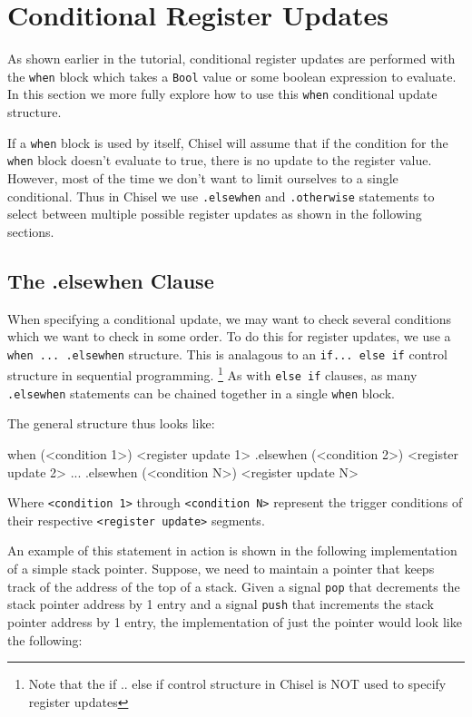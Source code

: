 \section{Conditional Register Updates}

As shown earlier in the tutorial, conditional register updates are performed with the \verb+when+ block which takes a \verb+Bool+ value or some boolean expression to evaluate.
In this section we more fully explore how to use this \verb+when+ conditional update structure.

If a \verb+when+ block is used by itself, Chisel will assume that if the condition for the \verb+when+ block doesn't evaluate to true, there is no update to the register value. However, most of the time we don't want to limit ourselves to a single conditional. Thus in Chisel we use \verb+.elsewhen+ and \verb+.otherwise+ statements to select between multiple possible register updates as shown in the following sections.

\subsection{The .elsewhen Clause}

When specifying a conditional update, we may want to check several conditions which we want to check in some order. 
To do this for register updates, we use a \verb+when ... .elsewhen+ structure. This is analagous to an \verb+if... else if+ control structure in sequential programming. \footnote{Note that the if .. else if control structure in Chisel is NOT used to specify register updates} 
As with \verb+else if+ clauses, as many \verb+.elsewhen+ statements can be chained together in a single \verb+when+ block. 

The general structure thus looks like:


\begin{scala}
when (<condition 1>) {<register update 1>}
.elsewhen (<condition 2>) {<register update 2>}
...
.elsewhen (<condition N>) {<register update N>}
\end{scala}

Where \verb+<condition 1>+ through \verb+<condition N>+ represent the trigger conditions of their respective \verb+<register update>+ segments.

An example of this statement in action is shown in the following implementation of a simple stack pointer. Suppose, we need to maintain a pointer that keeps track of the address of the top of a stack. Given a signal \verb+pop+ that decrements the stack pointer address by 1 entry and a signal \verb+push+ that increments the stack pointer address by 1 entry, the implementation of just the pointer would look like the following:

